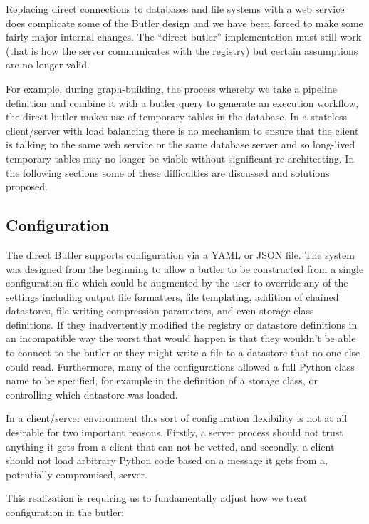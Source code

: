 Replacing direct connections to databases and file systems with a web service does complicate some of the Butler design and we have been forced to make some fairly major internal changes.
The ``direct butler'' implementation must still work (that is how the server communicates with the registry) but certain assumptions are no longer valid.

For example, during graph-building, the process whereby we take a pipeline definition and combine it with a butler query to generate an execution workflow,\cite{2023arXiv230303313L} the direct butler makes use of temporary tables in the database.
In a stateless client/server with load balancing there is no mechanism to ensure that the client is talking to the same web service or the same database server and so long-lived temporary tables may no longer be viable without significant re-architecting.
In the following sections some of these difficulties are discussed and solutions proposed.

\subsection{Configuration}

The direct Butler supports configuration via a YAML or JSON file.
The system was designed from the beginning to allow a butler to be constructed from a single configuration file which could be augmented by the user to override any of the settings including output file formatters, file templating, addition of chained datastores, file-writing compression parameters, and even storage class definitions.
If they inadvertently modified the registry or datastore definitions in an incompatible way the worst that would happen is that they wouldn't be able to connect to the butler or they might write a file to a datastore that no-one else could read.
Furthermore, many of the configurations allowed a full Python class name to be specified, for example in the definition of a storage class, or controlling which datastore was loaded.

In a client/server environment this sort of configuration flexibility is not at all desirable for two important reasons.
Firstly, a server process should not trust anything it gets from a client that can not be vetted, and secondly, a client should not load arbitrary Python code based on a message it gets from a, potentially compromised, server.

This realization is requiring us to fundamentally adjust how we treat configuration in the butler:

